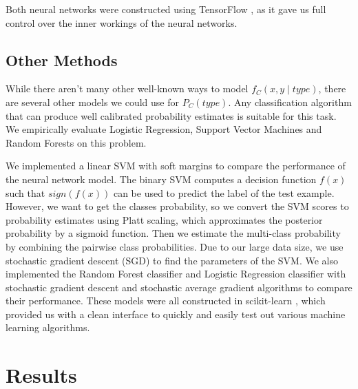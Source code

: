 \documentclass{article}
\begin{document}
Both neural networks were constructed using TensorFlow \cite{tensorflow2015-whitepaper}, as it gave us full control over the inner workings of the neural networks.  

\subsection{Other Methods}

While there aren't many other well-known ways to model $ f_C(x, y \mid type) $, there are several other models we could use for $ P_C(type) $.  Any classification algorithm that can produce well calibrated probability estimates is suitable for this task.  We empirically evaluate Logistic Regression, Support Vector Machines and Random Forests on this problem. 

We implemented a linear SVM with soft margins to compare the performance of the neural network model. The binary SVM computes a decision function $f(x)$ such that $sign(f(x))$ can be used to predict the label of the test example. However, we want to get the classes probability, so we convert the SVM scores to probability estimates using Platt scaling, which approximates the posterior probability by a sigmoid function\cite{lin2007note}. Then we estimate the multi-class probability by combining the pairwise class probabilities\cite{wu2004probability}.  Due to our large data size, we use stochastic gradient descent (SGD) to find the parameters of the SVM. We also implemented the Random Forest classifier and Logistic Regression classifier with stochastic gradient descent and stochastic average gradient algorithms to compare their performance.  These models were all constructed in scikit-learn \cite{scikit-learn}, which provided us with a clean interface to quickly and easily test out various machine learning algorithms.  

\section{Results}
\end{document}
